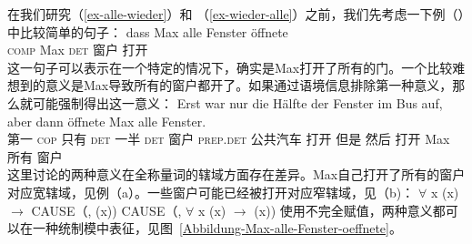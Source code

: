 在我们研究（\ref{ex-alle-wieder}）和 （\ref{ex-wieder-alle}）之前，我们先考虑一下例（）中比较简单的句子：
\ea
\gll dass Max alle Fenster öffnete\\
	 \textsc{comp} Max \textsc{det} 窗户 打开\\
\z
这一句子可以表示在一个特定的情况下，确实是Max打开了所有的门。一个比较难想到的意义是Max导致所有的窗户都开了。如果通过语境信息排除第一种意义，那么就可能强制得出这一意义\citep{Egg99a}：
\ea
\gll Erst war nur die Hälfte der Fenster im Bus auf, aber dann öffnete Max alle Fenster.\\
     第一 \textsc{cop} 只有 \textsc{det} 一半 \textsc{det} 窗户 \textsc{prep}.\textsc{det} 公共汽车 打开 但是 然后 打开 Max 所有 窗户\\
\z
这里讨论的两种意义在全称量词的辖域方面存在差异。Max自己打开了所有的窗户对应宽辖域，见例（a）。一些窗户可能已经被打开对应窄辖域，见（b)：
\eal
\ex $\forall$ x (x) $\to$ CAUSE（, (x))
\ex CAUSE（, $\forall$ x (x) $\to$ (x))
\zl
使用不完全赋值，两种意义都可以在一种统制模中表征，见图~\vref{Abbildung-Max-alle-Fenster-oeffnete}。
